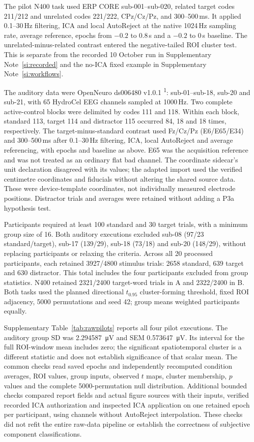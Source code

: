 The pilot N400 task used ERP CORE sub-001--sub-020, related target codes 211/212 and unrelated codes 221/222, CPz/Cz/Pz, and 300--500\,ms. It applied 0.1--30\,Hz filtering, ICA and local AutoReject at the native 1024\,Hz sampling rate, average reference, epochs from $-0.2$ to $0.8$\,s and a $-0.2$ to 0\,s baseline. The unrelated-minus-related contrast entered the negative-tailed ROI cluster test. This is separate from the recorded 10 October run in Supplementary Note~\ref*{si:recorded} and the no-ICA fixed example in Supplementary Note~\ref*{si:workflows}.

The auditory data were OpenNeuro ds006480 v1.0.1 \textsuperscript{1}: sub-01--sub-18, sub-20 and sub-21, with 65 HydroCel EEG channels sampled at 1000\,Hz. Two complete active-control blocks were delimited by codes 111 and 118. Within each block, standard 113, target 114 and distractor 115 occurred 84, 18 and 18 times, respectively. The target-minus-standard contrast used Fz/Cz/Pz (E6/E65/E34) and 300--500\,ms after 0.1--30\,Hz filtering, ICA, local AutoReject and average referencing, with epochs and baseline as above. E65 was the acquisition reference and was not treated as an ordinary flat bad channel. The coordinate sidecar's unit declaration disagreed with its values; the adapted import used the verified centimetre coordinates and fiducials without altering the shared source data. These were device-template coordinates, not individually measured electrode positions. Distractor trials and averages were retained without adding a P3a hypothesis test.

Participants required at least 100 standard and 30 target trials, with a minimum group size of 16. Both auditory executions excluded sub-08 (97/23 standard/target), sub-17 (139/29), sub-18 (73/18) and sub-20 (148/29), without replacing participants or relaxing the criteria. Across all 20 processed participants, each retained 3927/4800 stimulus trials: 2658 standard, 639 target and 630 distractor. This total includes the four participants excluded from group statistics. N400 retained 2321/2400 target-word trials in A and 2322/2400 in B. Both tasks used the planned directional $t_{0.95}$ cluster-forming threshold, fixed ROI adjacency, 5000 permutations and seed 42; group means weighted participants equally.

Supplementary Table~\ref*{tab:rawpilots} reports all four pilot executions. The auditory group SD was \SI{2.294587}{\uV} and SEM \SI{0.573647}{\uV}. Its interval for the full ROI-window mean includes zero; the significant spatiotemporal cluster is a different statistic and does not establish significance of that scalar mean. The common checks read saved epochs and independently recomputed condition averages, ROI values, group inputs, observed $t$ maps, cluster membership, $p$ values and the complete 5000-permutation null distribution. Additional bounded checks compared report fields and actual figure sources with their inputs, verified recorded ICA authorization and inspected ICA application on one retained epoch per participant, using channels without AutoReject interpolation. These checks did not refit the entire raw-data pipeline or establish the correctness of subjective component classifications.

